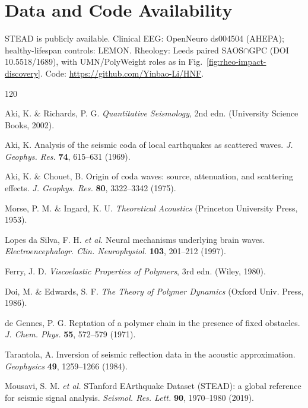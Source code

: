 \documentclass[twocolumn, 10pt]{article}
\begin{document}
\section*{Data and Code Availability}

STEAD is publicly available\cite{stead2019}. Clinical EEG: OpenNeuro ds004504 (AHEPA)\cite{miltiadous2023}; healthy-lifespan controls: LEMON\cite{babayan2019}. Rheology: Leeds paired SAOS\(\cap\)GPC (DOI 10.5518/1689)\cite{elliott2025}, with UMN/PolyWeight roles as in Fig.~\ref{fig:rheo-impact-discovery}. Code: \url{https://github.com/Yinbao-Li/HNF}.

\begin{thebibliography}{120}

 Aki, K. \& Richards, P. G. \emph{Quantitative Seismology}, 2nd edn. (University Science Books, 2002).

 Aki, K. Analysis of the seismic coda of local earthquakes as scattered waves. \emph{J. Geophys. Res.} \textbf{74}, 615--631 (1969).

 Aki, K. \& Chouet, B. Origin of coda waves: source, attenuation, and scattering effects. \emph{J. Geophys. Res.} \textbf{80}, 3322--3342 (1975).

 Morse, P. M. \& Ingard, K. U. \emph{Theoretical Acoustics} (Princeton University Press, 1953).

 Lopes da Silva, F. H. \emph{et al.} Neural mechanisms underlying brain waves. \emph{Electroencephalogr. Clin. Neurophysiol.} \textbf{103}, 201--212 (1997).

 Ferry, J. D. \emph{Viscoelastic Properties of Polymers}, 3rd edn. (Wiley, 1980).

 Doi, M. \& Edwards, S. F. \emph{The Theory of Polymer Dynamics} (Oxford Univ. Press, 1986).

 de Gennes, P. G. Reptation of a polymer chain in the presence of fixed obstacles. \emph{J. Chem. Phys.} \textbf{55}, 572--579 (1971).

 Tarantola, A. Inversion of seismic reflection data in the acoustic approximation. \emph{Geophysics} \textbf{49}, 1259--1266 (1984).

 Mousavi, S. M. \emph{et al.} STanford EArthquake Dataset (STEAD): a global reference for seismic signal analysis. \emph{Seismol. Res. Lett.} \textbf{90}, 1970--1980 (2019).


\end{thebibliography}
\end{document}
